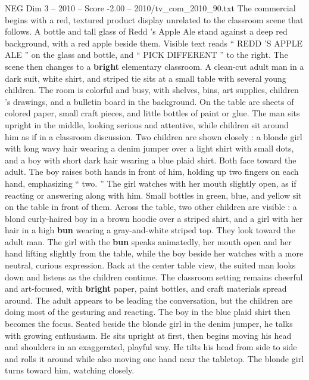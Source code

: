 \begin{textsample}{NEG Dim 3 – 2010 – Score -2.00 – 2010/tv\_com\_2010\_90.txt}  \label{ex:f3_neg_010}
The commercial begins with a red, textured product display unrelated to the classroom scene that follows.
A bottle and tall glass of Redd ’s Apple Ale stand against a deep red background, with a red apple beside them.
Visible text reads “ REDD ’S APPLE ALE ” on the glass and bottle, and “ PICK DIFFERENT ” to the right.
The scene then changes to a \textbf{bright} elementary classroom.
A clean-cut adult man in a dark suit, white shirt, and striped tie sits at a small table with several young children.
The room is colorful and busy, with shelves, bins, art supplies, children ’s drawings, and a bulletin board in the background.
On the table are sheets of colored paper, small craft pieces, and little bottles of paint or glue.
The man sits upright in the middle, looking serious and attentive, while children sit around him as if in a classroom discussion.
Two children are shown closely : a blonde girl with long wavy hair wearing a denim jumper over a light shirt with small dots, and a boy with short dark hair wearing a blue plaid shirt.
Both face toward the adult.
The boy raises both hands in front of him, holding up two fingers on each hand, emphasizing “ two. ” The girl watches with her mouth slightly open, as if reacting or answering along with him.
Small bottles in green, blue, and yellow sit on the table in front of them.
Across the table, two other children are visible : a blond curly-haired boy in a brown hoodie over a striped shirt, and a girl with her hair in a high \textbf{bun} wearing a gray-and-white striped top.
They look toward the adult man.
The girl with the \textbf{bun} speaks animatedly, her mouth open and her hand lifting slightly from the table, while the boy beside her watches with a more neutral, curious expression.
Back at the center table view, the suited man looks down and listens as the children continue.
The classroom setting remains cheerful and art-focused, with \textbf{bright} paper, paint bottles, and craft materials spread around.
The adult appears to be leading the conversation, but the children are doing most of the gesturing and reacting.
The boy in the blue plaid shirt then becomes the focus.
Seated beside the blonde girl in the denim jumper, he talks with growing enthusiasm.
He sits upright at first, then begins moving his head and shoulders in an exaggerated, playful way.
He tilts his head from side to side and rolls it around while also moving one hand near the tabletop.
The blonde girl turns toward him, watching closely.

\end{textsample}
